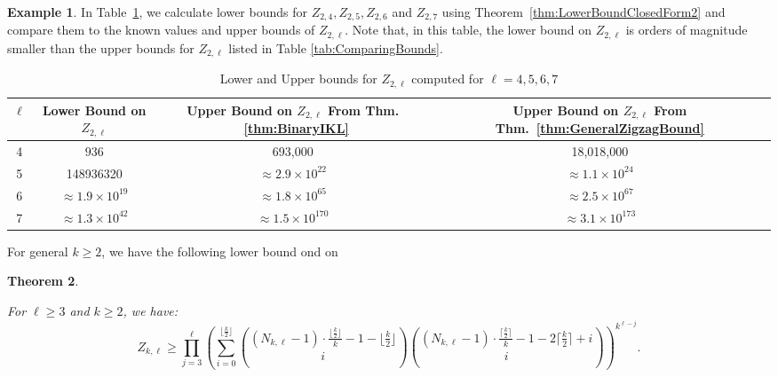 \documentclass[11pt]{article}
\newtheorem{theorem}{Theorem}[section]
\theoremstyle{remark}
\theoremstyle{definition}
\newtheorem{example}[theorem]{Example}
\begin{document}
\begin{example}
    In Table~\ref{tab:ComputationalLowerk2}, we calculate lower bounds for $Z_{2, 4}, Z_{2, 5}, Z_{2, 6}$ and $Z_{2, 7}$ using Theorem~\ref{thm:LowerBoundClosedForm2} and compare them to the known values and upper bounds of $Z_{2, \ell}$. Note that, in this table, the lower bound on $Z_{2, \ell}$ is orders of magnitude smaller than the upper bounds for $Z_{2, \ell}$ listed in Table \ref{tab:ComparingBounds}.
\begin{table}[H]
    \centering
    \begin{tabular}{|c|c|c|c|}
         \hline $\ell$ &  Lower Bound on $Z_{2, \ell}$  & Upper Bound on $Z_{2, \ell}$ From Thm. ~\ref{thm:BinaryIKL} & Upper Bound on $Z_{2, \ell}$ From Thm.~\ref{thm:GeneralZigzagBound} \\ \hline
         4 & $936$ & 693,000 & 18,018,000 \\ \hline
         5 & 148936320   & $\approx 2.9\times 10^{22}$ & $\approx 1.1 \times 10^{24}$ \\ \hline
         6 & $\approx 1.9 \times 10^{19}$ & $\approx 1.8\times 10^{65}$ & $\approx 2.5 \times 10^{67}$ \\ \hline 7 & $\approx 1.3 \times 10^{42}$ & $\approx 1.5 \times 10^{170}$ & $\approx 3.1 \times 10^{173}$ \\ \hline    \end{tabular}
    \caption{Lower and Upper bounds for $Z_{2, \ell}$ computed for $\ell=4, 5, 6, 7$}
    \label{tab:ComputationalLowerk2}
\end{table}
\end{example}

For general $k \geq 2$, we have the following lower bound ond on 
\begin{theorem}\label{thm:LowerBoundClosedFormk}

For $\ell \ge 3$ and $k \geq 2$, we have: \[Z_{k,\ell} \ge \prod_{j=3}^{\ell} \left(\sum_{i=0}^{\lfloor \frac{k}{2} \rfloor}\binom{(N_{k, \ell}-1) \cdot \frac{\lfloor \frac{k}{2} \rfloor}{k} -1-\lfloor \frac{k}{2}  \rfloor}{i} \binom{(N_{k, \ell}-1) \cdot \frac{\lceil \frac{k}{2} \rceil}{k} -1-2\lceil \frac{k}{2}  \rceil+i}{i} \right)^{k^{\ell-j}}.\]

\end{theorem}
\end{document}
